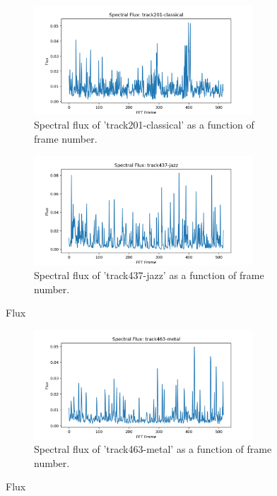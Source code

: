 \documentclass[11pt,a4paper]{article}
\begin{document}
\begin{figure}[tb]
	\centering
	\begin{subfigure}[t]{\hsize}
		\centering
		\includegraphics[width=0.9\textwidth]{flux_track201-classical}
		\caption{Spectral flux of 'track201-classical' as a function of frame number.}
		\label{fig:flux_classical}
	\end{subfigure}
	\begin{subfigure}[t]{\hsize}
		\centering
		\includegraphics[width=0.9\textwidth]{flux_track437-jazz}
		\caption{Spectral flux of 'track437-jazz' as a function of frame number.}
		\label{fig:flux_jazz}
	\end{subfigure}
	\caption{Flux \label{fig:flux}}
\end{figure}
\clearpage

\begin{figure}[tb]\ContinuedFloat
	\begin{subfigure}[t]{\hsize}
		\centering
		\includegraphics[width=0.9\textwidth]{flux_track463-metal}
		\caption{Spectral flux of 'track463-metal' as a function of frame number.}
		\label{fig:flux_metal}
	\end{subfigure}
	\caption{Flux}
\end{figure}
\end{document}
